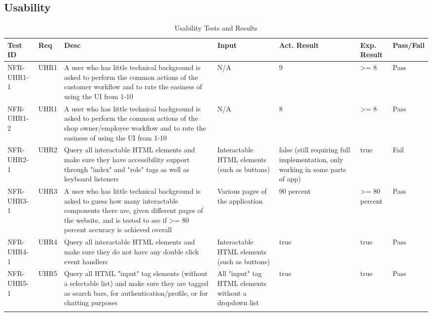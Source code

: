 \documentclass[12pt, titlepage]{article}
\begin{document}
\subsection{Usability}

\begin{longtable}{|p{}|p{}|p{}|p{}|p{}|p{}|p{}|}
        \hline
        
        Test ID & Req & Desc & Input & Act. Result & Exp. Result & Pass/Fail \\
        \hline
        
        NFR-UHR1-1 &
        UHR1 & 
        A user who has little technical background is asked to perform the common actions of the customer workflow and to rate the easiness of using the UI from 1-10 & 
        N/A &
        9 &
        \textgreater = 8 &
        Pass \\
        \hline

        NFR-UHR1-2 &
        UHR1 & 
        A user who has little technical background is asked to perform the common actions of the shop owner/employee workflow and to rate the easiness of using the UI from 1-10 & 
        N/A &
        8 &
        \textgreater = 8 &
        Pass \\
        \hline

        NFR-UHR2-1 &
        UHR2 & 
        Query all interactable HTML elements and make sure they have accessibility support through "index" and "role" tags as well as keyboard listeners & 
        Interactable HTML elements (such as buttons) &
        false (still requiring full implementation, only working in some parts of app) &
        true  &
        Fail \\
        \hline

        NFR-UHR3-1 &
        UHR3 & 
        A user who has little technical background is asked to guess how many interactable components there are, given different pages of the website, and is tested to see if \textgreater = 80 percent accuracy is achieved overall &
        Various pages of the application &
        90 percent &
        \textgreater = 80 percent &
        Pass \\
        \hline

        NFR-UHR4-1 &
        UHR4 & 
        Query all interactable HTML elements and make sure they do not have any double click event handlers & 
        Interactable HTML elements (such as buttons) &
        true &
        true  &
        Pass \\
        \hline

        NFR-UHR5-1 &
        UHR5 & 
        Query all HTML "input" tag elements (without a selectable list) and make sure they are tagged as search bars, for authentication/profile, or for chatting purposes &
        All "input" tag HTML elements without a dropdown list &
        true &
        true  &
        Pass \\
        \hline
    \caption{Usability Tests and Results}
    \end{longtable}
\end{document}
